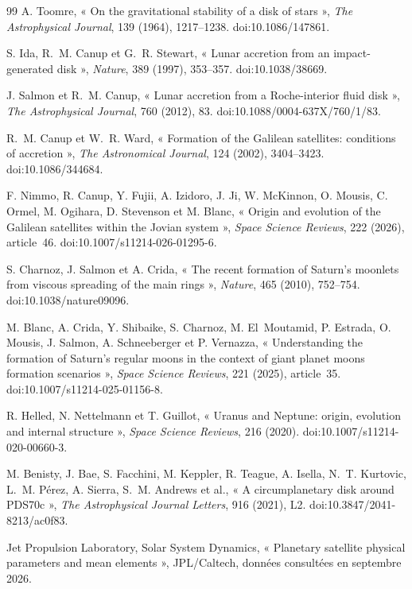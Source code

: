 \documentclass[11pt,a4paper,openany]{report}
\begin{document}
\begin{thebibliography}{99}
 A. Toomre, « On the gravitational stability of a disk of stars »,
\emph{The Astrophysical Journal}, 139 (1964), 1217--1238. doi:10.1086/147861.

 S. Ida, R.~M. Canup et G.~R. Stewart, « Lunar accretion from an impact-generated
disk », \emph{Nature}, 389 (1997), 353--357. doi:10.1038/38669.

 J. Salmon et R.~M. Canup, « Lunar accretion from a Roche-interior fluid
disk », \emph{The Astrophysical Journal}, 760 (2012), 83. doi:10.1088/0004-637X/760/1/83.

 R.~M. Canup et W.~R. Ward, « Formation of the Galilean satellites:
conditions of accretion », \emph{The Astronomical Journal}, 124 (2002), 3404--3423.
doi:10.1086/344684.

 F. Nimmo, R. Canup, Y. Fujii, A. Izidoro, J. Ji, W. McKinnon, O. Mousis,
C. Ormel, M. Ogihara, D. Stevenson et M. Blanc, « Origin and evolution of the Galilean satellites
within the Jovian system », \emph{Space Science Reviews}, 222 (2026), article~46.
doi:10.1007/s11214-026-01295-6.

 S. Charnoz, J. Salmon et A. Crida, « The recent formation of Saturn's
moonlets from viscous spreading of the main rings », \emph{Nature}, 465 (2010), 752--754.
doi:10.1038/nature09096.

 M. Blanc, A. Crida, Y. Shibaike, S. Charnoz, M. El~Moutamid, P. Estrada,
O. Mousis, J. Salmon, A. Schneeberger et P. Vernazza, « Understanding the formation of Saturn's
regular moons in the context of giant planet moons formation scenarios », \emph{Space Science
Reviews}, 221 (2025), article~35. doi:10.1007/s11214-025-01156-8.

 R. Helled, N. Nettelmann et T. Guillot, « Uranus and Neptune: origin,
evolution and internal structure », \emph{Space Science Reviews}, 216 (2020).
doi:10.1007/s11214-020-00660-3.

 M. Benisty, J. Bae, S. Facchini, M. Keppler, R. Teague, A. Isella,
N.~T. Kurtovic, L.~M. Pérez, A. Sierra, S.~M. Andrews et al., « A circumplanetary disk around
PDS70c », \emph{The Astrophysical Journal Letters}, 916 (2021), L2. doi:10.3847/2041-8213/ac0f83.

 Jet Propulsion Laboratory, Solar System Dynamics, « Planetary satellite physical
parameters and mean elements », JPL/Caltech, données consultées en septembre 2026.


\end{thebibliography}
\end{document}
